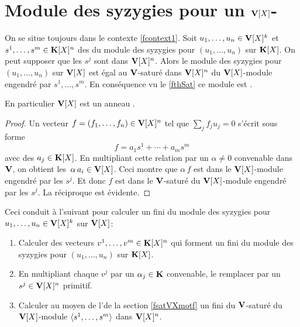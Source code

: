 \section{Module des syzygies pour un $\mathbf{V}[X]$-\mtf} \label{fVXsysygies}

\begin{ftheorem} \label{fthsyzygies} 
On se situe toujours dans le contexte \ref{fcontext1}.
Soit $u_1,\dots,u_n\in\mathbf{V}[X]^k$ et $s^1,\dots,s^m\in\mathbf{K}[X]^n$ des \gtrs du
module des syzygies pour $(u_1,\dots,u_n)$ sur $\mathbf{K}[X]$. On peut supposer que
les $s^j$ sont dans $\mathbf{V}[X]^n$. Alors le  module des syzygies pour $(u_1,\dots,u_n)$ sur $\mathbf{V}[X]$ est égal au $\mathbf{V}$-saturé  dans $\mathbf{V}[X]^n$ du $\mathbf{V}[X]$-module engendré par 
$s^1,\dots,s^m$. En conséquence vu le \tho \ref{fthSat}
ce module est \tf. 

\noindent En particulier $\mathbf{V}[X]$ est un anneau \coh.
\end{ftheorem}

%
\begin{proof}
Un vecteur $f=(f_1,\dots,f_n)\in\mathbf{V}[X]^n$ tel que $\sum_jf_ju_j=0$
s'écrit sous forme 
  $$
  f=a_1s^1+\cdots+a_ms^m
  $$ 
avec des $a_j\in\mathbf{K}[X]$. 
En multipliant cette relation par un $\alpha\neq 0$ convenable dans $\mathbf{V}$, 
on obtient les~$\alpha\, a_i\in\mathbf{V}[X]$. Ceci montre que $\alpha\,f$ est dans le $\mathbf{V}[X]$-module engendré par les $s^j$. Et donc $f$ est dans le
$\mathbf{V}$-saturé du $\mathbf{V}[X]$-module engendré par les $s^j$.
La réciproque est évidente.
\end{proof}
%

Ceci conduit à l'\algo suivant pour calculer un \sgr fini du module des syzygies pour $u_1,\dots,u_n\in\mathbf{V}[X]^k$ sur $\mathbf{V}[X]$:
%
\begin{enumerate}
%
\item Calculer des vecteurs  $v^1,\dots,v^m\in\mathbf{K}[X]^n$ qui forment un \sgr fini du  module des syzygies pour $(u_1,\dots,u_n)$ sur $\mathbf{K}[X]$.
%
\item En multipliant chaque $v^j$ par un $\alpha_j\in\mathbf{K}$ convenable, le remplacer par un $s^j\in\mathbf{V}[X]^n$ primitif.
%
\item Calculer au moyen de l'\algo de la section \ref{fsatVXmotf} un \sgr fini
du $\mathbf{V}$-saturé du $\mathbf{V}[X]$-module  $\langle{s^1,\dots,s^m}\rangle$ dans $\mathbf{V}[X]^n$.
%
\end{enumerate}




